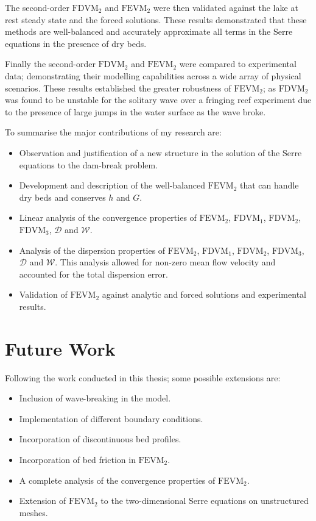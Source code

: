 The second-order $\text{FDVM}_2$ and $\text{FEVM}_2$ were then validated against the lake at rest steady state and the forced solutions. These results demonstrated that these methods are well-balanced and accurately approximate all terms in the Serre equations in the presence of dry beds. 

Finally the second-order $\text{FDVM}_2$ and $\text{FEVM}_2$ were compared to experimental data; demonstrating their modelling capabilities across a wide array of physical scenarios. These results established the greater robustness of $\text{FEVM}_2$; as $\text{FDVM}_2$ was found to be unstable for the solitary wave over a fringing reef experiment due to the presence of large jumps in the water surface as the wave broke. 

To summarise the major contributions of my research are:
\begin{itemize}
	\item Observation and justification of a new structure in the solution of the Serre equations to the dam-break problem.
	\item Development and description of the well-balanced $\text{FEVM}_2$ that can handle dry beds and conserves $h$ and $G$.
	\item Linear analysis of the convergence properties of $\text{FEVM}_2$, $\text{FDVM}_1$, $\text{FDVM}_2$, $\text{FDVM}_3$, $\mathcal{D}$ and $\mathcal{W}$.
	\item Analysis of the dispersion properties of $\text{FEVM}_2$, $\text{FDVM}_1$, $\text{FDVM}_2$, $\text{FDVM}_3$, $\mathcal{D}$ and $\mathcal{W}$. This analysis allowed for non-zero mean flow velocity and accounted for the total dispersion error.
	\item Validation of $\text{FEVM}_2$ against analytic and forced solutions and experimental results. 
\end{itemize}

\section{Future Work}
Following the work conducted in this thesis; some possible extensions are:
\begin{itemize}
	\item Inclusion of wave-breaking in the model.  %
	\item Implementation of different boundary conditions.
	\item Incorporation of discontinuous bed profiles.
	\item Incorporation of bed friction in $\text{FEVM}_2$.
	\item A complete analysis of the convergence properties of $\text{FEVM}_2$.
	\item Extension of $\text{FEVM}_2$ to the two-dimensional Serre equations on unstructured meshes.
\end{itemize}

